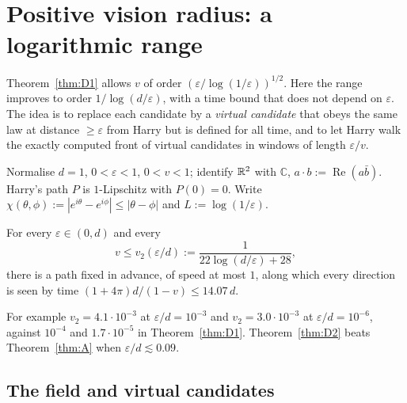 
\section{Positive vision radius: a logarithmic range}\label{sec:D2}

Theorem~\ref{thm:D1} allows $v$ of order $(\varepsilon/\log(1/\varepsilon))^{1/2}$. Here the range improves to order
$1/\log(d/\varepsilon)$, with a time bound that does not depend on $\varepsilon$. The idea is to replace each candidate by a
\emph{virtual candidate} that obeys the same law at distance $\ge\varepsilon$ from Harry but is defined for all time, and to let
Harry walk the exactly computed front of virtual candidates in windows of length $\varepsilon/v$.

Normalise $d=1$, $0<\varepsilon<1$, $0<v<1$; identify $\mathbb{R}^2$ with $\mathbb C$, $a\cdot b:=\operatorname{Re}(a\bar b)$. Harry's path
$P$ is $1$-Lipschitz with $P(0)=0$. Write $\chi(\theta,\phi):=|e^{i\theta}-e^{i\phi}|\le|\theta-\phi|$ and $L:=\log(1/\varepsilon)$.

\begin{theorem}[D2]\label{thm:D2}
For every $\varepsilon\in(0,d)$ and every
\[
v\le v_2(\varepsilon/d):=\frac{1}{22\log(d/\varepsilon)+28},
\]
there is a path fixed in advance, of speed at most $1$, along which every direction is seen by time
$(1+4\pi)d/(1-v)\le14.07\,d$.
\end{theorem}

For example $v_2=4.1\cdot10^{-3}$ at $\varepsilon/d=10^{-3}$ and $v_2=3.0\cdot10^{-3}$ at $\varepsilon/d=10^{-6}$, against
$10^{-4}$ and $1.7\cdot10^{-5}$ in Theorem~\ref{thm:D1}. Theorem~\ref{thm:D2} beats Theorem~\ref{thm:A} when $\varepsilon/d\lesssim0.09$.

\subsection{The field and virtual candidates}

